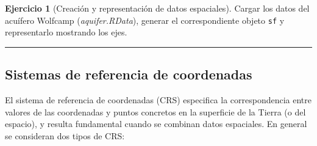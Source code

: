 \documentclass[
]{book}
\theoremstyle{break}
\theoremstyle{definition}
\theoremstyle{definition}
\theoremstyle{definition}
\newtheorem{exercise}{Ejercicio}[chapter]
\theoremstyle{definition}
\theoremstyle{remark}
\begin{document}
\begin{exercise}[Creación y representación de datos espaciales]
\protect\hypertarget{exr:aquifer1}{}\label{exr:aquifer1}Cargar los datos del acuífero Wolfcamp (\emph{aquifer.RData}), generar el correspondiente
objeto \texttt{sf} y representarlo mostrando los ejes.
\end{exercise}

\begin{center}\rule{0.5\linewidth}{0.5pt}\end{center}

\subsection{Sistemas de referencia de coordenadas}\label{crs}

El sistema de referencia de coordenadas (CRS) especifica la correspondencia entre valores de las coordenadas y puntos concretos en la superficie de la Tierra (o del espacio), y resulta fundamental cuando se combinan datos espaciales.
En general se consideran dos tipos de CRS:
\end{document}
